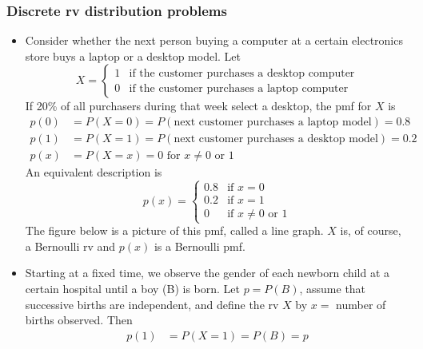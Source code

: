 \documentclass{report}
\begin{document}
    \subsubsection{Discrete rv distribution problems}
    \begin{itemize}
        \item Consider whether the next person buying a computer at a certain electronics store buys a laptop or a desktop model. Let
            \[
                X = 
                \begin{cases} 
                    1 & \text{if the customer purchases a desktop computer} \\
                    0 & \text{if the customer purchases a laptop computer} 
                \end{cases}
            \]
            If 20\% of all purchasers during that week select a desktop, the pmf for \( X \) is
            \[
                \begin{aligned}
                    p(0) &= P(X = 0) = P(\text{next customer purchases a laptop model}) = 0.8 \\
                    p(1) &= P(X = 1) = P(\text{next customer purchases a desktop model}) = 0.2 \\
                    p(x) &= P(X = x) = 0 \text{ for } x \ne 0 \text{ or } 1
                \end{aligned}
            \]
            An equivalent description is
            \[
                p(x) = 
                \begin{cases}
                    0.8 & \text{if } x = 0 \\
                    0.2 & \text{if } x = 1 \\
                    0 & \text{if } x \ne 0 \text{ or } 1
                \end{cases}
            \]
            The figure below is a picture of this pmf, called a line graph. \( X \) is, of course, a Bernoulli rv and \( p(x) \) is a Bernoulli pmf.
            \bigbreak \noindent 
        \item Starting at a fixed time, we observe the gender of each newborn child at a certain hospital until a boy (B) is born. Let \( p = P(B) \), assume that successive births are independent, and define the rv \( X \) by \( x = \) number of births observed. Then
            \[
                \begin{aligned}
                    p(1) &= P(X = 1) = P(B) = p \\

\end{aligned}\]
\end{itemize}
\end{document}
